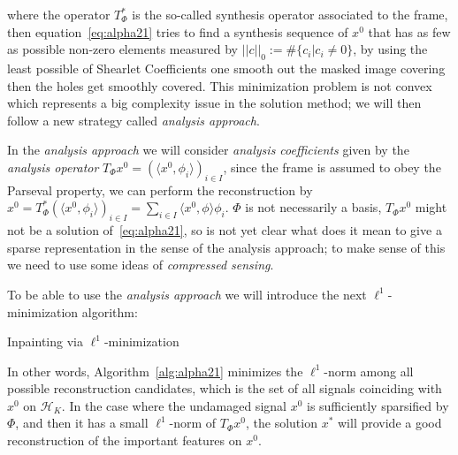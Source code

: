 where the operator $T^*_{\Phi}$ is the so-called synthesis operator associated to the frame, then equation~\ref{eq:alpha21} tries to find a synthesis sequence of $x^0$ that has as few as possible non-zero elements measured by $||c||_0:=\#\{c_i|c_i\neq 0\}$, by using the least possible of Shearlet Coefficients one smooth out the masked image covering then the holes get smoothly covered. This minimization problem is not convex which represents a big complexity issue in the solution method; we will then follow a new strategy called \textit{analysis approach}.

\bigskip

In the \textit{analysis approach} we will consider \textit{analysis coefficients} given by the \textit{analysis operator} $T_{\Phi}x^0=(\langle x^0,\phi_i\rangle)_{i\in I}$, since the frame is assumed to obey the Parseval property, we can perform the reconstruction by $x^0=T^*_{\Phi}(\langle x^0,\phi_i\rangle)_{i\in I}=\sum_{i\in I}\langle x^0,\phi\rangle\phi_i$. $\Phi$ is not necessarily a basis, $T_{\Phi}x^0$ might not be a solution of~\ref{eq:alpha21}, so is not yet clear what does it mean to give a sparse representation in the sense of the analysis approach; to make sense of this we need to use some ideas of \textit{compressed sensing}.

\bigskip

To be able to use the \textit{analysis approach} we will introduce the next $\ell^1$-minimization algorithm:

\bigskip

\begin{algorithm}[h!]

    \caption{Inpainting via $\ell^1$-minimization}
		\label{alg:alpha21}
\end{algorithm}

\bigskip

In other words, Algorithm~\ref{alg:alpha21} minimizes the $\ell^1$-norm among all possible reconstruction candidates, which is the set of all signals coinciding with $x^0$ on $\mathcal{H}_K$. In the case where the undamaged signal $x^0$ is sufficiently sparsified by $\Phi$, and then it has a small $\ell^1$-norm of $T_{\Phi}x^0$, the solution $x^*$ will provide a good reconstruction of the important features on $x^0$.

